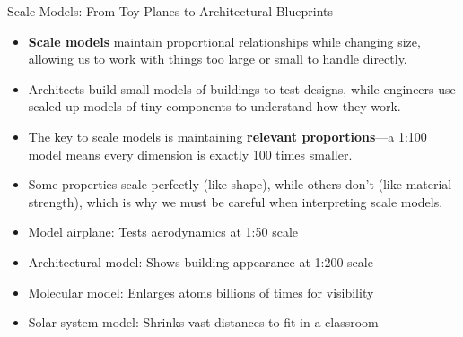 \documentclass{beamer}
\begin{document}
	\begin{frame}{Scale Models: From Toy Planes to Architectural Blueprints}
		\begin{itemize}
			\item \textbf{Scale models} maintain proportional relationships while changing size, allowing us to work with things too large or small to handle directly.
			\item Architects build small models of buildings to test designs, while engineers use scaled-up models of tiny components to understand how they work.
			\item The key to scale models is maintaining \textbf{relevant proportions}—a 1:100 model means every dimension is exactly 100 times smaller.
			\item Some properties scale perfectly (like shape), while others don't (like material strength), which is why we must be careful when interpreting scale models.
		\end{itemize}
		
		\begin{example}
			\begin{itemize}
				\item Model airplane: Tests aerodynamics at 1:50 scale
				\item Architectural model: Shows building appearance at 1:200 scale
				\item Molecular model: Enlarges atoms billions of times for visibility
				\item Solar system model: Shrinks vast distances to fit in a classroom
			\end{itemize}
		\end{example}
	\end{frame}
	
\end{document}
